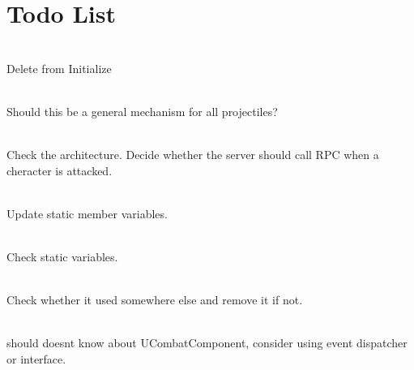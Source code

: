\chapter{Todo List}
\hypertarget{todo}{}\label{todo}

\begin{DoxyRefList}
\item[Member \doxylink{class_a_area_explosion_a34edddea7d56c0c44da62d1229de3002}{AArea\+Explosion\+::Radius} ]\hfill \\
\label{todo__todo000006}%
%
Delete from Initialize  
\item[Member \doxylink{class_a_projectile_base_a96de7d3048e15b97d3b7b6c4133864be}{AProjectile\+Base\+::Initialize\+From\+Launch} (const FVector \&Launch\+Velocity, float Gravity\+ZOverride=0.\+0f)]\hfill \\
\label{todo__todo000012}%
%
Should this be a general mechanism for all projectiles?  
\item[Member \doxylink{class_a_weapon_base_aa76a14fbee3d5b4050a3ae03a4bc734f}{AWeapon\+Base\+::Client\+\_\+\+Start\+Attack} ()]\hfill \\
\label{todo__todo000013}%
%
Check the architecture. Decide whether the server should call RPC when a cheracter is attacked.  
\item[Class \doxylink{class_a_weapon_melee}{AWeapon\+Melee} ]\hfill \\
\label{todo__todo000015}%
%
Update static member variables.  
\item[Class \doxylink{class_a_weapon_throwable}{AWeapon\+Throwable} ]\hfill \\
\label{todo__todo000018}%
%
Check static variables.  
\item[Member \doxylink{_custom_input_component_8h_adffab3f7ba97d694dec7973a6bcd0979}{EInput\+Action\+Id} ]\hfill \\
\label{todo__todo000003}%
%
Check whether it used somewhere else and remove it if not.  
\item[Class \doxylink{class_u_attack_finished}{UAttack\+Finished} ]\hfill \\
\label{todo__todo000001}%
%
 should doesn\textquotesingle{}t know about UCombat\+Component, consider using event dispatcher or interface.  
\item[Class \doxylink{class_u_base_ability}{UBase\+Ability} ]\hfill \\

\end{DoxyRefList}
